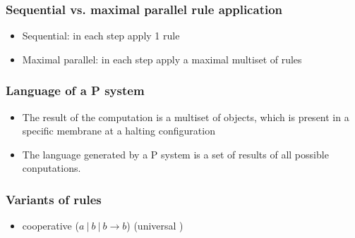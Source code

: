 


    \begin{frame}[t]\frametitle{Sequential vs. maximal parallel rule application}
      \begin{itemize}
        \item Sequential: in each step apply 1 rule
        \item Maximal parallel: in each step apply a maximal multiset of rules
      \end{itemize}
      \simulationpicture
    \end{frame}
    \note{}

    \begin{frame}[t]\frametitle{Language of a P system}
      \begin{itemize}
        \item The result of the computation is a multiset of objects, which is present in a specific membrane at a halting configuration
        \item The language generated by a P system is a set of results of all possible conputations.
      \end{itemize}
    \end{frame}
    \note{}
    \newpage
    \note{}

    \begin{frame}[t]\frametitle{Variants of rules}
      \begin{itemize}
        \item cooperative ($a\ |\ b\ |\ b \rightarrow b$) (universal \cite{Paun98})
      \end{itemize}
    \end{frame}
    \note{}
    \newpage
    \note{}

